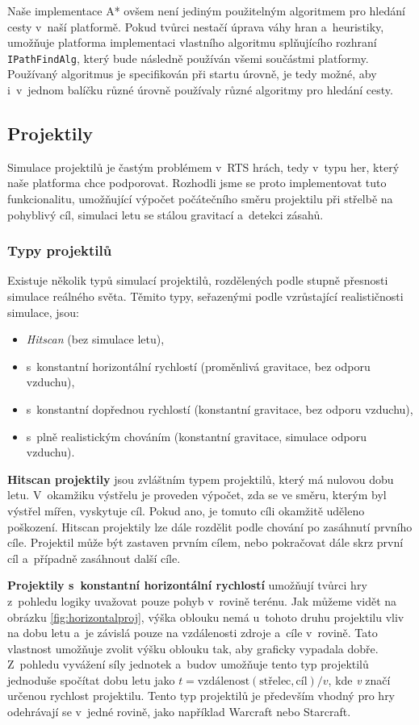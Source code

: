 Naše implementace A* ovšem není jediným použitelným algoritmem pro hledání cesty v~naší platformě. Pokud tvůrci nestačí úprava váhy hran a~heuristiky, umožňuje platforma implementaci vlastního algoritmu splňujícího rozhraní \texttt{IPathFindAlg}, který bude následně používán všemi součástmi platformy. Používaný algoritmus je specifikován při startu úrovně, je tedy možné, aby i~v~jednom balíčku různé úrovně používaly různé algoritmy pro hledání cesty.

\subsection{Projektily}
Simulace projektilů je častým problémem v~RTS hrách, tedy v~typu her, který naše platforma chce podporovat. Rozhodli jsme se proto implementovat tuto funkcionalitu, umožňující výpočet počátečního směru projektilu při střelbě na pohyblivý cíl, simulaci letu se stálou gravitací a~detekci zásahů. 

\subsubsection{Typy projektilů}
Existuje několik typů simulací projektilů, rozdělených podle stupně přesnosti simulace reálného světa. Těmito typy, seřazenými podle vzrůstající realističnosti simulace, jsou:
\begin{itemize}
	\item \textit{Hitscan} (bez simulace letu),
	\item s~konstantní horizontální rychlostí (proměnlivá gravitace, bez odporu vzduchu),
	\item s~konstantní dopřednou rychlostí (konstantní gravitace, bez odporu vzduchu),
	\item s~plně realistickým chováním (konstantní gravitace, simulace odporu vzduchu).
\end{itemize}

\textbf{Hitscan projektily} jsou zvláštním typem projektilů, který má nulovou dobu letu. V~okamžiku výstřelu je proveden výpočet, zda se ve směru, kterým byl výstřel mířen, vyskytuje cíl. Pokud ano, je tomuto cíli okamžitě uděleno poškození. Hitscan projektily lze dále rozdělit podle chování po zasáhnutí prvního cíle. Projektil může být zastaven prvním cílem, nebo pokračovat dále skrz první cíl a~případně zasáhnout další cíle.

\textbf{Projektily s~konstantní horizontální rychlostí} umožňují tvůrci hry z~pohledu logiky uvažovat pouze pohyb v~rovině terénu. Jak můžeme vidět na obrázku \ref{fig:horizontalproj}, výška oblouku nemá u~tohoto druhu projektilu vliv na dobu letu a~je závislá pouze na vzdálenosti zdroje a~cíle v~rovině. Tato vlastnost umožňuje zvolit výšku oblouku tak, aby graficky vypadala dobře. Z~pohledu vyvážení síly jednotek a~budov umožňuje tento typ projektilů jednoduše spočítat dobu letu jako \( t=\text{vzdálenost}(\text{střelec}, \text{cíl}) / v \), kde \textit{v} značí určenou rychlost projektilu. Tento typ projektilů je především vhodný pro hry odehrávají se v~jedné rovině, jako například Warcraft nebo Starcraft.


